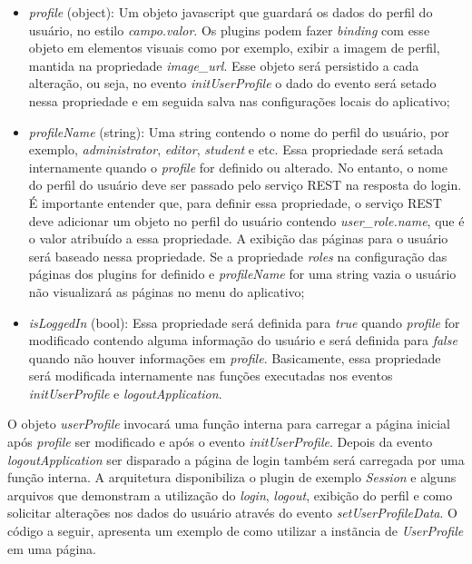 \begin{itemize}
	\item \textit{profile} (object): Um objeto javascript que guardará os dados do perfil do usuário, no estilo \textit{campo.valor}. Os plugins podem fazer \textit{binding} com esse objeto em elementos visuais como por exemplo, exibir a imagem de perfil, mantida na propriedade \textit{image\_url}. Esse objeto será persistido a cada alteração, ou seja, no evento \textit{initUserProfile} o dado do evento será setado nessa propriedade e em seguida salva nas configurações locais do aplicativo;

	\item \textit{profileName} (string): Uma string contendo o nome do perfil do usuário, por exemplo, \textit{administrator}, \textit{editor}, \textit{student} e etc. Essa propriedade será setada internamente quando o \textit{profile} for definido ou alterado. No entanto, o nome do perfil do usuário deve ser passado pelo serviço REST na resposta do login. É importante entender que, para definir essa propriedade, o serviço REST deve adicionar um objeto no perfil do usuário contendo \textit{user\_role.name}, que é o valor atribuído a essa propriedade. A exibição das páginas para o usuário será baseado nessa propriedade. Se a propriedade \textit{roles} na configuração das páginas dos plugins for definido e \textit{profileName} for uma string vazia o usuário não visualizará as páginas no menu do aplicativo;

	\item \textit{isLoggedIn} (bool): Essa propriedade será definida para \textit{true} quando \textit{profile} for modificado contendo alguma informação do usuário e será definida para \textit{false} quando não houver informações em \textit{profile}. Basicamente, essa propriedade será modificada internamente nas funções executadas nos eventos \textit{initUserProfile} e \textit{logoutApplication}.
\end{itemize}

O objeto \textit{userProfile} invocará uma função interna para carregar a página inicial após \textit{profile} ser modificado e após o evento \textit{initUserProfile}. Depois da evento \textit{logoutApplication} ser disparado a página de login também será carregada por uma função interna. A arquitetura disponibiliza o plugin de exemplo \textit{Session} e alguns arquivos que demonstram a utilização do \textit{login}, \textit{logout}, exibição do perfil e como solicitar alterações nos dados do usuário através do evento \textit{setUserProfileData}. O código a seguir, apresenta um exemplo de como utilizar a instãncia de \textit{UserProfile} em uma página.

